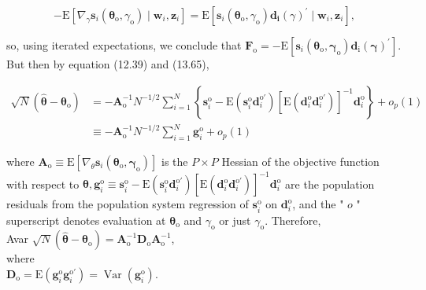 \documentclass[10pt]{article}
\begin{document}
\begin{equation*}
-\mathrm{E}\left[\nabla_{\gamma} \mathbf{s}_{i}\left(\boldsymbol{\theta}_{\mathrm{o}}, \gamma_{\mathrm{o}}\right) \mid \mathbf{w}_{i}, \mathbf{z}_{i}\right]=\mathrm{E}\left[\mathbf{s}_{i}\left(\boldsymbol{\theta}_{\mathrm{o}}, \gamma_{\mathrm{o}}\right) \mathbf{d}_{\mathbf{i}}(\gamma)^{\prime} \mid \mathbf{w}_{i}, \mathbf{z}_{i}\right], \tag{13.67}
\end{equation*}


so, using iterated expectations, we conclude that $\mathbf{F}_{\mathrm{o}}=-\mathrm{E}\left[\mathbf{s}_{i}\left(\boldsymbol{\theta}_{\mathrm{o}}, \boldsymbol{\gamma}_{\mathrm{o}}\right) \mathbf{d}_{\mathrm{i}}(\boldsymbol{\gamma})^{\prime}\right]$. But then by equation (12.39) and (13.65),

$$
\begin{aligned}
\sqrt{N}\left(\hat{\boldsymbol{\theta}}-\boldsymbol{\theta}_{\mathrm{o}}\right) & =-\mathbf{A}_{\mathrm{o}}^{-1} N^{-1 / 2} \sum_{i=1}^{N}\left\{\mathbf{s}_{i}^{\mathrm{o}}-\mathrm{E}\left(\mathbf{s}_{i}^{\mathrm{o}} \mathbf{d}_{i}^{\mathrm{o} \prime}\right)\left[\mathrm{E}\left(\mathbf{d}_{i}^{\mathrm{o}} \mathbf{d}_{i}^{\mathrm{o} \prime}\right)\right]^{-1} \mathbf{d}_{i}^{\mathrm{o}}\right\}+o_{p}(1) \\
& \equiv-\mathbf{A}_{\mathrm{o}}^{-1} N^{-1 / 2} \sum_{i=1}^{N} \mathbf{g}_{i}^{\mathrm{o}}+o_{p}(1)
\end{aligned}
$$

where $\mathbf{A}_{\mathrm{o}} \equiv \mathrm{E}\left[\nabla_{\theta} \mathbf{s}_{i}\left(\boldsymbol{\theta}_{\mathrm{o}}, \boldsymbol{\gamma}_{\mathrm{o}}\right)\right]$ is the $P \times P$ Hessian of the objective function with respect to $\boldsymbol{\theta}, \mathbf{g}_{i}^{\mathrm{o}} \equiv \mathbf{s}_{i}^{\mathrm{o}}-\mathrm{E}\left(\mathbf{s}_{i}^{\mathrm{o}} \mathbf{d}_{i}^{\mathrm{o} \prime}\right)\left[\mathrm{E}\left(\mathbf{d}_{i}^{\mathrm{o}} \mathbf{d}_{i}^{\mathrm{o} \prime}\right)\right]^{-1} \mathbf{d}_{i}^{\mathrm{o}}$ are the population residuals from the population system regression of $\mathbf{s}_{i}^{\mathrm{o}}$ on $\mathbf{d}_{i}^{\mathrm{o}}$, and the " $o$ " superscript denotes evaluation at $\boldsymbol{\theta}_{\mathrm{o}}$ and $\gamma_{\mathrm{o}}$ or just $\gamma_{\mathrm{o}}$. Therefore,\\
Avar $\sqrt{N}\left(\hat{\boldsymbol{\theta}}-\boldsymbol{\theta}_{\mathrm{o}}\right)=\mathbf{A}_{\mathrm{o}}^{-1} \mathbf{D}_{\mathrm{o}} \mathbf{A}_{\mathrm{o}}^{-1}$,\\
where\\
$\mathbf{D}_{\mathrm{o}}=\mathrm{E}\left(\mathbf{g}_{i}^{\mathrm{o}} \mathbf{g}_{i}^{\mathrm{o} \prime}\right)=\operatorname{Var}\left(\mathbf{g}_{i}^{\mathrm{o}}\right)$.
\end{document}
